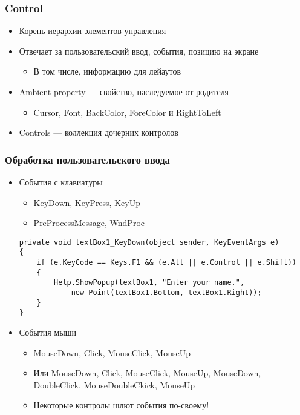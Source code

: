 \documentclass[xetex,mathserif,serif]{beamer}
\begin{document}
	\begin{frame}
		\frametitle{Control}
		\begin{itemize}
			\item Корень иерархии элементов управления
			\item Отвечает за пользовательский ввод, события, позицию на экране
			\begin{itemize}
				\item В том числе, информацию для лейаутов
			\end{itemize}
			\item Ambient property --- свойство, наследуемое от родителя
			\begin{itemize}
				\item Cursor, Font, BackColor, ForeColor и RightToLeft
			\end{itemize}
			\item Controls --- коллекция дочерних контролов
		\end{itemize}
	\end{frame}

	\begin{frame}[fragile]
		\frametitle{Обработка пользовательского ввода}
		\begin{itemize}
			\item События с клавиатуры
			\begin{itemize}
				\item KeyDown, KeyPress, KeyUp
				\item PreProcessMessage, WndProc
			\end{itemize}
			\begin{scriptsize}
				\begin{verbatim}
private void textBox1_KeyDown(object sender, KeyEventArgs e)
{
    if (e.KeyCode == Keys.F1 && (e.Alt || e.Control || e.Shift))
    {
        Help.ShowPopup(textBox1, "Enter your name.", 
            new Point(textBox1.Bottom, textBox1.Right));
    }
}
				\end{verbatim}
			\end{scriptsize}
			\item События мыши
			\begin{itemize}
				\item MouseDown, Click, MouseClick, MouseUp
				\item Или MouseDown, Click, MouseClick, MouseUp, MouseDown, DoubleClick, MouseDoubleCkick, MouseUp
				\item Некоторые контролы шлют события по-своему!
			\end{itemize}
		\end{itemize}
	\end{frame}
\end{document}
